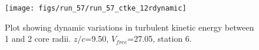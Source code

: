 \begin{figure}[H]
\centering
\texttt{[image: figs/run\_57/run\_57\_ctke\_12rdynamic]}
\caption{Plot showing dynamic variations in turbulent kinetic energy between 1 and 2 core radii. $z/c$=9.50, $V_{free}$=27.05, station 6.}
\end{figure}


